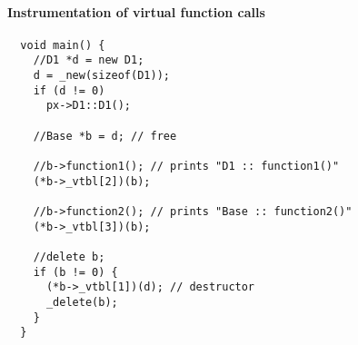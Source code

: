 \documentclass{memo}
\begin{document}
\paragraph{Instrumentation of virtual function calls}
\begin{verbatim}
  void main() {
    //D1 *d = new D1;
    d = _new(sizeof(D1));
    if (d != 0)
      px->D1::D1();

    //Base *b = d; // free

    //b->function1(); // prints "D1 :: function1()"
    (*b->_vtbl[2])(b);

    //b->function2(); // prints "Base :: function2()"
    (*b->_vtbl[3])(b);

    //delete b;
    if (b != 0) {
      (*b->_vtbl[1])(d); // destructor
      _delete(b);
    }
  }
\end{verbatim}
\end{document}
